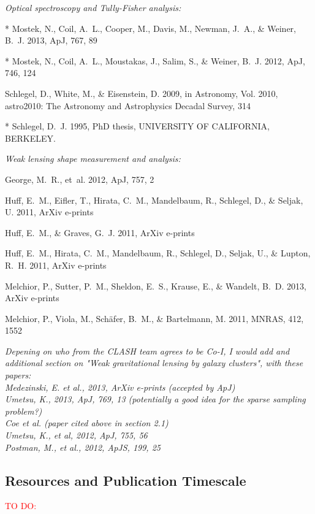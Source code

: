 \documentclass[12pt]{article}
\begin{document}
{\small
\begin{description}
\item \textit{Optical spectroscopy and Tully-Fisher analysis:}
  \begin{description}
  \item {}, N., {Coil}, A.~L., {Cooper}, M., {Davis}, M., {Newman}, J.~A., \&
    {Weiner}, B.~J. 2013, ApJ, 767, 89
  \item {}, N., {Coil}, A.~L., {Moustakas}, J., {Salim}, S., \& {Weiner}, B.~J.
    2012, ApJ, 746, 124
  \item {Schlegel}, D., {White}, M., \& {Eisenstein}, D. 2009, in Astronomy, Vol. 2010,
    astro2010: The Astronomy and Astrophysics Decadal Survey, 314
  \item {}, D.~J. 1995, PhD thesis, UNIVERSITY OF CALIFORNIA, BERKELEY.
  \end{description}
\item \textit{Weak lensing shape measurement and analysis:}
  \begin{description}
  \item {George}, M.~R., {et~al.} 2012, ApJ, 757, 2
  \item {Huff}, E.~M., {Eifler}, T., {Hirata}, C.~M., {Mandelbaum}, R., {Schlegel}, D.,
    \& {Seljak}, U. 2011{}, ArXiv e-prints
  \item {Huff}, E.~M., \& {Graves}, G.~J. 2011, ArXiv e-prints
  \item {Huff}, E.~M., {Hirata}, C.~M., {Mandelbaum}, R., {Schlegel}, D., {Seljak}, U.,
    \& {Lupton}, R.~H. 2011{}, ArXiv e-prints
  \item {Melchior}, P., {Sutter}, P.~M., {Sheldon}, E.~S., {Krause}, E., \& {Wandelt},
    B.~D. 2013, ArXiv e-prints
  \item {Melchior}, P., {Viola}, M., {Sch{\"a}fer}, B.~M., \& {Bartelmann}, M. 2011,
    MNRAS, 412, 1552
  \end{description}
\end{description}
}

{\color{red}\it Depening on who from the CLASH team agrees to be Co-I, I would add and additional section on "Weak gravitational lensing by galaxy clusters", with these papers:\\
Medezinski, E. et al., 2013, ArXiv e-prints (accepted by ApJ)\\
Umetsu, K., 2013, ApJ, 769, 13 (potentially a good idea for the sparse sampling problem?)\\
Coe et al. (paper cited above in section 2.1)\\
Umetsu, K., et al, 2012, ApJ, 755, 56\\
Postman, M., et al., 2012, ApJS, 199, 25
} 


\subsection{Resources and Publication Timescale}
\textcolor{Red}{TO DO:}
\end{document}
